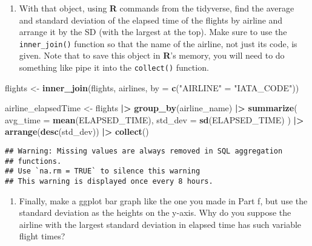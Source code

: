 \documentclass[
]{article}
\newenvironment{Shaded}{\begin{snugshade}}{\end{snugshade}}
\newcommand{\AttributeTok}[1]{\textcolor[rgb]{0.13,0.29,0.53}{#1}}
\newcommand{\FunctionTok}[1]{\textcolor[rgb]{0.13,0.29,0.53}{\textbf{#1}}}
\newcommand{\NormalTok}[1]{#1}
\newcommand{\OtherTok}[1]{\textcolor[rgb]{0.56,0.35,0.01}{#1}}
\newcommand{\SpecialCharTok}[1]{\textcolor[rgb]{0.81,0.36,0.00}{\textbf{#1}}}
\newcommand{\StringTok}[1]{\textcolor[rgb]{0.31,0.60,0.02}{#1}}
\providecommand{\tightlist}{%
  \setlength{\itemsep}{0pt}\setlength{\parskip}{0pt}}
\begin{document}
\begin{enumerate}
\def\labelenumi{\arabic{enumi}.}
\setcounter{enumi}{1}
\tightlist
\item
  With that object, using \textbf{R} commands from the tidyverse, find
  the average and standard deviation of the elapsed time of the flights
  by airline and arrange it by the SD (with the largest at the top).
  Make sure to use the \texttt{inner\_join()} function so that the name
  of the airline, not just its code, is given. Note that to save this
  object in \textbf{R}'s memory, you will need to do something like pipe
  it into the \texttt{collect()} function.
\end{enumerate}

\begin{Shaded}
\begin{Highlighting}[]
\NormalTok{flights }\OtherTok{\textless{}{-}} \FunctionTok{inner\_join}\NormalTok{(flights, airlines, }\AttributeTok{by =} \FunctionTok{c}\NormalTok{(}\StringTok{"AIRLINE"} \OtherTok{=} \StringTok{"IATA\_CODE"}\NormalTok{)) }

\NormalTok{airline\_elapsedTime }\OtherTok{\textless{}{-}}\NormalTok{ flights }\SpecialCharTok{|\textgreater{}}  
  \FunctionTok{group\_by}\NormalTok{(airline\_name) }\SpecialCharTok{|\textgreater{}} 
  \FunctionTok{summarize}\NormalTok{(}
    \AttributeTok{avg\_time =} \FunctionTok{mean}\NormalTok{(ELAPSED\_TIME),}
    \AttributeTok{std\_dev =} \FunctionTok{sd}\NormalTok{(ELAPSED\_TIME)}
\NormalTok{  ) }\SpecialCharTok{|\textgreater{}} 
  \FunctionTok{arrange}\NormalTok{(}\FunctionTok{desc}\NormalTok{(std\_dev)) }\SpecialCharTok{|\textgreater{}} 
  \FunctionTok{collect}\NormalTok{()}
\end{Highlighting}
\end{Shaded}

\begin{verbatim}
## Warning: Missing values are always removed in SQL aggregation
## functions.
## Use `na.rm = TRUE` to silence this warning
## This warning is displayed once every 8 hours.
\end{verbatim}

\begin{enumerate}
\def\labelenumi{\arabic{enumi}.}
\setcounter{enumi}{2}
\tightlist
\item
  Finally, make a ggplot bar graph like the one you made in Part f, but
  use the standard deviation as the heights on the y-axis. Why do you
  suppose the airline with the largest standard deviation in elapsed
  time has such variable flight times?
\end{enumerate}
\end{document}
